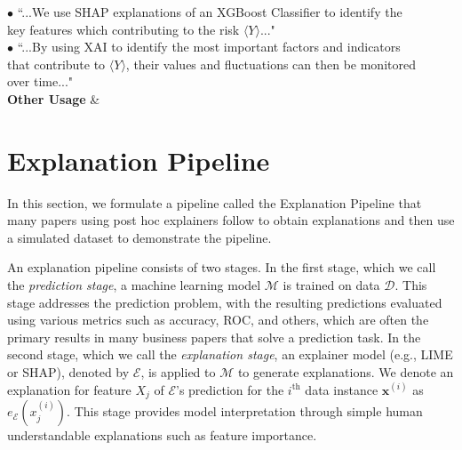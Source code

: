 \documentclass[12pt]{article}  %
\begin{document}
\begin{table}[htbp]
\begin{tabu}
{$\bullet$ ``...We use SHAP explanations of an XGBoost Classifier to identify the \\ key features which contributing to the risk $\langle Y\rangle$..."\\
$\bullet$ ``...By using XAI to identify the most important factors and indicators \\ that contribute to $\langle Y\rangle$, their values and fluctuations can then be monitored \\ over time..."} \\
\hline
\textbf{Other Usage}
 &  \\
\bottomrule
\end{tabu}
\label{tab:metric_examples}
\end{table}



\section{Explanation Pipeline}
    \label{sec:pipeline_demo}
    In this section, we formulate a pipeline called the Explanation Pipeline that many papers using post hoc explainers follow to obtain explanations and then use a simulated dataset to demonstrate the pipeline.
    
An explanation pipeline consists of two stages. In the first stage, which we call the \emph{prediction stage}, a machine learning model $\mathcal{M}$ is trained on data $\mathcal{D}$. This stage addresses the prediction problem, with the resulting predictions evaluated using various metrics such as accuracy, ROC, and others, which are often the primary results in many business papers that solve a prediction task. In the second stage, which we call the \emph{explanation stage}, an explainer model (e.g., LIME or SHAP), denoted by $\mathcal{E}$, is applied to $\mathcal{M}$ to generate explanations. We denote an explanation for feature $X_j$ of $\mathcal{E}$'s prediction for the $i^{\text{th}}$ data instance $\mathbf{x}^{(i)}$ as $e_{\mathcal{E}}(x^{(i)}_j)$. This stage provides model interpretation through simple human understandable explanations such as feature importance. %
    
\end{document}
